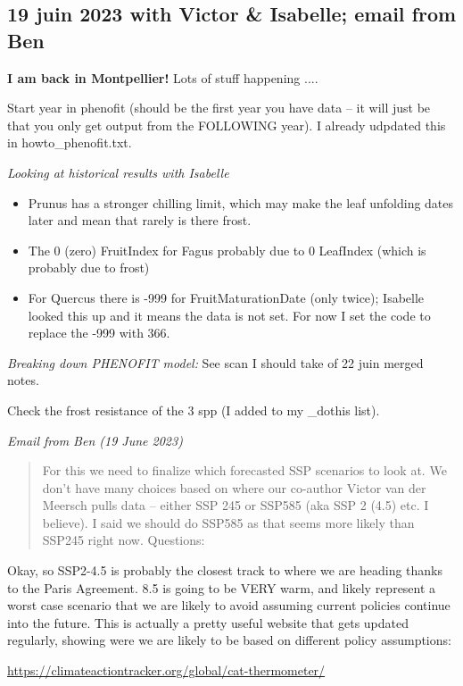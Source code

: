 \documentclass[11pt,letter]{article}
\begin{document}
\subsection{19 juin 2023 with Victor \& Isabelle; email from Ben}

{\bf I am back in Montpellier!} Lots of stuff happening ....

Start year in phenofit (should be the first year you have data -- it will just be that you only get output from the FOLLOWING year). I already udpdated this in howto\_phenofit.txt.

\emph{Looking at historical results with Isabelle}
\begin{itemize}
\item Prunus has a stronger chilling limit, which may make the leaf unfolding dates later and mean that rarely is there frost.
\item The 0 (zero) FruitIndex for Fagus probably due to 0 LeafIndex (which is probably due to frost)
\item For Quercus there is -999 for FruitMaturationDate (only twice); Isabelle looked this up and it means the data is not set. For now I set the code to replace the -999 with 366. 
\end{itemize}

\emph{Breaking down PHENOFIT model:} See scan I should take of 22 juin merged notes.


Check the frost resistance of the 3 spp (I added to my \_dothis list). 

\emph{Email from Ben (19 June 2023)}

\begin{quote}
For this we need to finalize which forecasted SSP scenarios to look at. We don't have many choices based on where our co-author Victor van der Meersch pulls data -- either SSP 245 or SSP585 (aka SSP 2 (4.5) etc. I believe). I said we should do SSP585 as that seems more likely than SSP245 right now. Questions:
\end{quote}

Okay, so SSP2-4.5 is probably the closest track to where we are heading thanks to the Paris Agreement. 8.5 is going to be VERY warm, and likely represent a worst case scenario that we are likely to avoid assuming current policies continue into the future. This is actually a pretty useful website that gets updated regularly, showing were we are likely to be based on different policy assumptions:

\url{https://climateactiontracker.org/global/cat-thermometer/}
\end{document}
